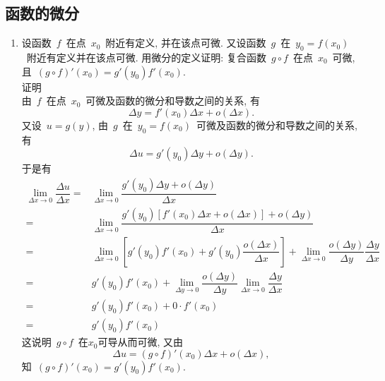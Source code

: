 \documentclass[UTF8,a4paper,20pt]{article}
\begin{document}
\subsection{函数的微分}
\begin{enumerate}
\item 设函数~$f$~在点~$x_0$~附近有定义, 并在该点可微. 又设函数~$g$~在~$y_0=f(x_0)$~附近有定义并在该点可微. 用微分的定义证明: 复合函数~$g\circ f$~在点~$x_0$~可微, 且~$(g\circ f)'(x_0)=g'(y_0)f'(x_0)$.\\
{\heiti 证明}\\
由~$f$~在点~$x_0$~可微及函数的微分和导数之间的关系, 有
\[ \Delta y=f'(x_0)\Delta x+o(\Delta x). \]
又设~$u=g(y)$, 由~$g$~在~$y_0=f(x_0)$~可微及函数的微分和导数之间的关系, 有
\[ \Delta u=g'(y_0)\Delta y+o(\Delta y). \]
于是有
\begin{equation*}
	\begin{split}
	\lim\limits_{\Delta x\to 0}\dfrac{\Delta u}{\Delta x}=&\lim\limits_{\Delta x\to 0} \dfrac{g'(y_0)\Delta y+o(\Delta y)}{\Delta x}\\	
	=&\lim\limits_{\Delta x\to 0}\dfrac{g'(y_0)[f'(x_0)\Delta x+o(\Delta x)]+o(\Delta y)}{\Delta x}\\
	=&\lim\limits_{\Delta x\to 0} \left[ g'(y_0)f'(x_0)+g'(y_0)\dfrac{o(\Delta x)}{\Delta x} \right]+\lim\limits_{\Delta x\to 0} \dfrac{o(\Delta y)}{\Delta y}\dfrac{\Delta y}{\Delta x} \\
	=&g'(y_0)f'(x_0)+\lim\limits_{\Delta y\to 0} \dfrac{o(\Delta y)}{\Delta y} \lim\limits_{\Delta x\to 0} \dfrac{\Delta y}{\Delta x}\\
	=&g'(y_0)f'(x_0)+0\cdot f'(x_0)\\
	=&g'(y_0)f'(x_0)
	\end{split}
\end{equation*}
这说明~$g\circ f$~在$x_0$可导从而可微, 又由
\[ \Delta u=(g\circ f)'(x_0) \Delta x +o(\Delta x), \]
知~$(g\circ f)'(x_0)=g'(y_0)f'(x_0)$. 


\end{enumerate}
\end{document}
